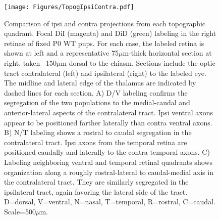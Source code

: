 \begin{figure}[hbtp]
    \begin{center}
        \texttt{[image: Figures/TopogIpsiContra.pdf]}
        \caption[Comparison of ipsi and contra projections from each topographic quadrant.]
        {Comparison of ipsi and contra projections from each topographic quadrant.
        Focal DiI (magenta) and DiD (green) labeling in the right retinae of fixed P0 WT pups.
        For each case, the labeled retina is shown at left and a representative 75$\mu$m-thick horizontal section at right, taken ~150$\mu$m dorsal to the chiasm.
        Sections include the optic tract contralateral (left) and ipsilateral (right) to the labeled eye.
        The midline and lateral edge of the thalamus are indicated by dashed lines for each section.
        A) D/V labeling confirms the segregation of the two populations to the medial-caudal and anterior-lateral aspects of the contralateral tract.
        Ipsi ventral axons appear to be positioned farther laterally than contra ventral axons.
        B) N/T labeling shows a rostral to caudal segregation in the contralateral tract.
        Ipsi axons from the temporal retina are positioned caudally and laterally to the contra temporal axons.
        C) Labeling neighboring ventral and temporal retinal quadrants shows organization along a roughly rostral-lateral to caudal-medial axis in the contralateral tract.
        They are similarly segregated in the ipsilateral tract, again favoring the lateral side of the tract.
        D=dorsal, V=ventral, N=nasal, T=temporal, R=rostral, C=caudal.
        Scale=500$\mu$m.}
        \label{Figures/TopogIpsiContra}
    \end{center}
\end{figure}

